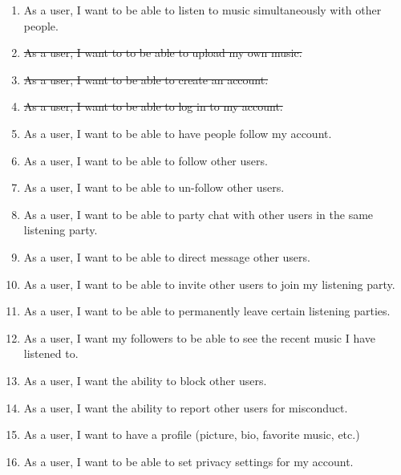 \documentclass[11pt]{report}
\begin{document}
    \begin{enumerate}

    \item As a user, I want to be able to listen to music simultaneously with other people.
    
    \item \st{As a user, I want to to be able to upload my own music.}
        
    \item \st{As a user, I want to be able to create an account.}
    
    \item \st{As a user, I want to be able to log in to my account.}

    \item As a user, I want to be able to have people follow my account.

    \item As a user, I want to be able to follow other users.
    
    \item As a user, I want to be able to un-follow other users.
    
    \item As a user, I want to be able to party chat with other users in the same listening party.
    
    \item As a user, I want to be able to direct message other users.
    
    \item As a user, I want to be able to invite other users to join my listening party.
    
    \item As a user, I want to be able to permanently leave certain listening parties.
    
    \item As a user, I want my followers to be able to see the recent music I have listened to.
    
    \item As a user, I want the ability to block other users. 
    
    \item As a user, I want the ability to report other users for misconduct.
    
    \item As a user, I want to have a profile (picture, bio, favorite music, etc.)
    
    \item As a user, I want to be able to set privacy settings for my account.
    

\end{enumerate}
\end{document}
